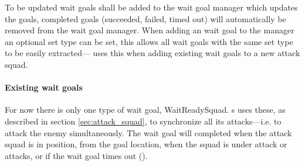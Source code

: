 To be updated wait goals shall be added to the wait goal manager which updates the goals, completed goals (succeeded, failed, timed out) will automatically be removed from the wait goal manager. When adding an wait goal to the manager an optional set type can be set, this allows all wait goals with the same set type to be easily extracted— uses this when adding existing wait goals to a new attack squad.

\paragraph{Existing wait goals}
For now there is only one type of wait goal, WaitReadySquad. s uses these, as described in section \ref{sec:attack_squad}, to synchronize all its attacks—i.e. to attack the enemy simultaneously. The wait goal will completed when the attack squad is in position, \squadAttackWaitingPositionDistanceFromGoal from the goal location, when the squad is under attack or attacks, or if the wait goal times out (\attackCoordinatorWaitGoalTimeout).